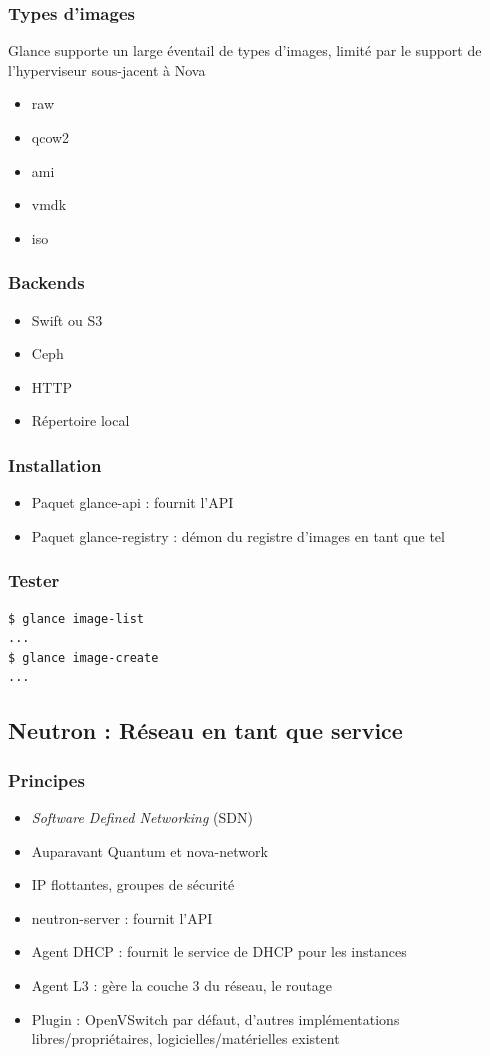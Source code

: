   \begin{frame}
    \frametitle{Types d'images}
    Glance supporte un large éventail de types d'images, limité par le support de l'hyperviseur sous-jacent à Nova
    \begin{itemize}
      \item raw
      \item qcow2
      \item ami
      \item vmdk
      \item iso
    \end{itemize}
  \end{frame}

  \begin{frame}
    \frametitle{Backends}
    \begin{itemize}
      \item Swift ou S3
      \item Ceph
      \item HTTP
      \item Répertoire local
    \end{itemize}
  \end{frame}

  \begin{frame}
    \frametitle{Installation}
    \begin{itemize}
      \item Paquet glance-api : fournit l'API
      \item Paquet glance-registry : démon du registre d'images en tant que tel
    \end{itemize}
  \end{frame}

  \begin{frame}[containsverbatim]
    \frametitle{Tester}
\begin{verbatim}
$ glance image-list
...
$ glance image-create
...
\end{verbatim}
  \end{frame}

  \subsection[Neutron]{Neutron : Réseau en tant que service}

  \begin{frame}
    \frametitle{Principes}
    \begin{itemize}
      \item \textit{Software Defined Networking} (SDN)
      \item Auparavant Quantum et nova-network
      \item IP flottantes, groupes de sécurité
      \item neutron-server : fournit l'API
      \item Agent DHCP : fournit le service de DHCP pour les instances
      \item Agent L3 : gère la couche 3 du réseau, le routage
      \item Plugin : OpenVSwitch par défaut, d'autres implémentations libres/propriétaires, logicielles/matérielles existent
    \end{itemize}
  \end{frame}

